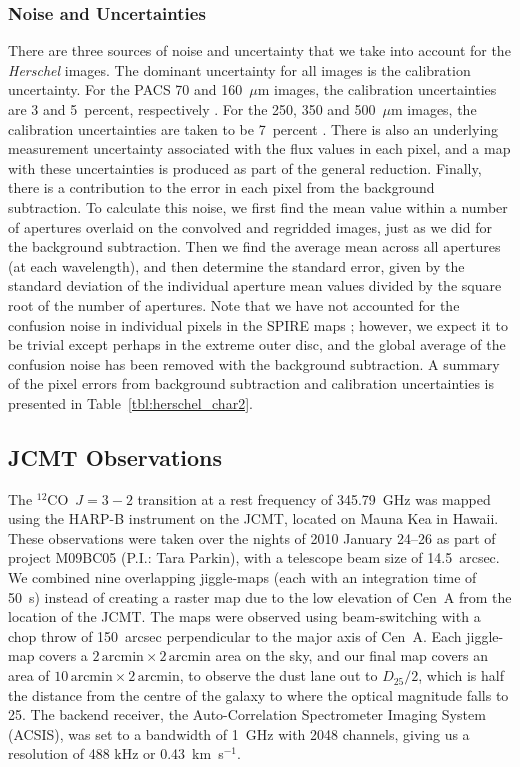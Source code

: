 \subsubsection{Noise and Uncertainties}\label{subsec:Noise}
There are three sources of noise and uncertainty that we take into account for the \emph{Herschel} images.  The dominant uncertainty for all images is the calibration uncertainty.  For the PACS 70 and 160~$\mu$m images, the calibration uncertainties are 3 and 5~percent, respectively \citep{PACS_OM}.  For the 250, 350 and 500~$\mu$m images, the calibration uncertainties are taken to be 7~percent \citep{SOM_2010}.  There is also an underlying measurement uncertainty associated with the flux values in each pixel, and a map with these uncertainties is produced as part of the general reduction.  Finally, there is a contribution to the error in each pixel from the background subtraction.  To calculate this noise, we first find the mean value within a number of apertures overlaid on the convolved and regridded images, just as we did for the background subtraction.  Then we find the average mean across all apertures (at each wavelength), and then determine the standard error, given by the standard deviation of the individual aperture mean values divided by the square root of the number of apertures.  Note that we have not accounted for the confusion noise in individual pixels in the SPIRE maps \citep[see ][]{2010A&A...518L...5N}; however, we expect it to be trivial except perhaps in the extreme outer disc, and the global average of the confusion noise has been removed with the background subtraction.  A summary of the pixel errors from background subtraction and calibration uncertainties is presented in Table~\ref{tbl:herschel_char2}.


\subsection{JCMT Observations}\label{subsec:JCMT}
 The $^{12}$CO~$J = 3-2$ transition at a rest frequency of 345.79~GHz was mapped using the HARP-B instrument on the JCMT, located on Mauna Kea in Hawaii.  These observations were taken over the nights of 2010 January 24--26 as part of project M09BC05 (P.I.: Tara Parkin), with a telescope beam size of 14.5~arcsec.  We combined nine overlapping jiggle-maps (each with an integration time of 50~s) instead of creating a raster map due to the low elevation of Cen~A from the location of the JCMT.  The maps were observed using beam-switching with a chop throw of 150~arcsec perpendicular to the major axis of Cen~A.  Each jiggle-map covers a $2 \mathrm{\,arcmin} \times 2 \mathrm{\,arcmin}$ area on the sky, and our final map covers an area of $10 \mathrm{\,arcmin} \times 2 \mathrm{\,arcmin}$, to observe the dust lane out to $D_{25}/2$, which is half the distance from the centre of the galaxy to where the optical magnitude falls to 25.  The backend receiver, the Auto-Correlation Spectrometer Imaging System (ACSIS), was set to a bandwidth of 1~GHz with 2048 channels, giving us a resolution of 488 kHz or 0.43~km~s$^{-1}$.

